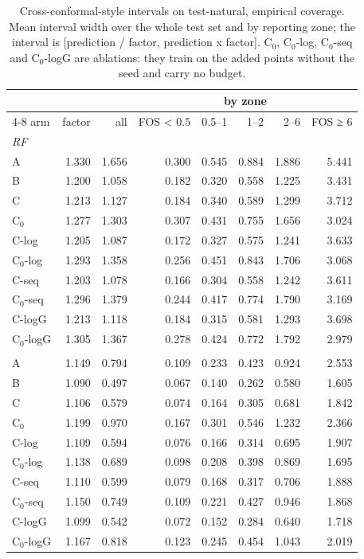 \begin{table}[htbp]
\centering
\caption{Cross-conformal-style intervals on test-natural, empirical coverage. Mean interval width over the whole test set and by reporting zone; the interval is [prediction / factor, prediction x factor]. C$_0$, C$_0$-log, C$_0$-seq and C$_0$-logG are ablations: they train on the added points without the seed and carry no budget.}
\label{tab:test-natural__log-rmse:conformal:width}
\begin{tabular}{lrrrrrrr}
\toprule
 &  &  & \multicolumn{5}{c}{by zone} \\
\cmidrule(lr){4-8}
arm & factor & all & FOS < 0.5 & 0.5–1 & 1–2 & 2–6 & FOS ≥ 6 \\
\midrule
\multicolumn{8}{l}{\textit{RF}} \\
A & 1.330 & 1.656 & 0.300 & 0.545 & 0.884 & 1.886 & 5.441 \\
B & 1.200 & 1.058 & 0.182 & 0.320 & 0.558 & 1.225 & 3.431 \\
C & 1.213 & 1.127 & 0.184 & 0.340 & 0.589 & 1.299 & 3.712 \\
C$_0$ & 1.277 & 1.303 & 0.307 & 0.431 & 0.755 & 1.656 & 3.024 \\
C-log & 1.205 & 1.087 & 0.172 & 0.327 & 0.575 & 1.241 & 3.633 \\
C$_0$-log & 1.293 & 1.358 & 0.256 & 0.451 & 0.843 & 1.706 & 3.068 \\
C-seq & 1.203 & 1.078 & 0.166 & 0.304 & 0.558 & 1.242 & 3.611 \\
C$_0$-seq & 1.296 & 1.379 & 0.244 & 0.417 & 0.774 & 1.790 & 3.169 \\
C-logG & 1.213 & 1.118 & 0.184 & 0.315 & 0.581 & 1.293 & 3.698 \\
C$_0$-logG & 1.305 & 1.367 & 0.278 & 0.424 & 0.772 & 1.792 & 2.979 \\
\addlinespace
\multicolumn{8}{l}{\textit{GBM}} \\
A & 1.149 & 0.794 & 0.109 & 0.233 & 0.423 & 0.924 & 2.553 \\
B & 1.090 & 0.497 & 0.067 & 0.140 & 0.262 & 0.580 & 1.605 \\
C & 1.106 & 0.579 & 0.074 & 0.164 & 0.305 & 0.681 & 1.842 \\
C$_0$ & 1.199 & 0.970 & 0.167 & 0.301 & 0.546 & 1.232 & 2.366 \\
C-log & 1.109 & 0.594 & 0.076 & 0.166 & 0.314 & 0.695 & 1.907 \\
C$_0$-log & 1.138 & 0.689 & 0.098 & 0.208 & 0.398 & 0.869 & 1.695 \\
C-seq & 1.110 & 0.599 & 0.079 & 0.168 & 0.317 & 0.706 & 1.888 \\
C$_0$-seq & 1.150 & 0.749 & 0.109 & 0.221 & 0.427 & 0.946 & 1.868 \\
C-logG & 1.099 & 0.542 & 0.072 & 0.152 & 0.284 & 0.640 & 1.718 \\
C$_0$-logG & 1.167 & 0.818 & 0.123 & 0.245 & 0.454 & 1.043 & 2.019 \\
\bottomrule
\end{tabular}
\end{table}
